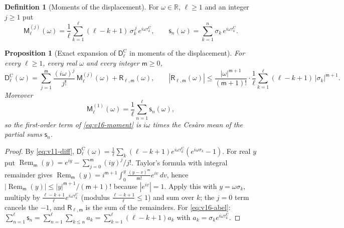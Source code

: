 \documentclass[11pt,a4paper]{article}
\numberwithin{equation}{section}
\newtheorem{proposition}[theorem]{Proposition}
\theoremstyle{definition}
\newtheorem{definition}[theorem]{Definition}
\theoremstyle{remark}
\begin{document}
\begin{definition}[Moments of the displacement]\label{def:v16-moments}
For $\omega\in\mathbb R$, $\ell\ge1$ and an integer $j\ge1$ put
\begin{equation}
\mathsf M_\ell^{(j)}(\omega)=\frac1\ell\sum_{k=1}^{\ell}(\ell-k+1)\,\sigma_k^{\,j}\,e^{i\omega\tau_k^{\mathrm C}},\qquad
\mathsf s_n(\omega)=\sum_{k=1}^{n}\sigma_k\,e^{i\omega\tau_k^{\mathrm C}} .
\end{equation}
\end{definition}

\begin{proposition}[Exact expansion of $\mathsf D_\ell^{\mathrm C}$ in moments of the displacement]\label{prop:v16-moment}
For every $\ell\ge1$, every real $\omega$ and every integer $\mathsf m\ge0$,
\begin{equation}\label{eq:v16-moment}
\mathsf D_\ell^{\mathrm C}(\omega)=\sum_{j=1}^{\mathsf m}\frac{(i\omega)^j}{j!}\,\mathsf M_\ell^{(j)}(\omega)+\mathsf R_{\ell,\mathsf m}(\omega),\qquad
|\mathsf R_{\ell,\mathsf m}(\omega)|\le\frac{|\omega|^{\mathsf m+1}}{(\mathsf m+1)!}\cdot\frac1\ell\sum_{k=1}^{\ell}(\ell-k+1)\,|\sigma_k|^{\mathsf m+1}.
\end{equation}
Moreover
\begin{equation}\label{eq:v16-abel}
\mathsf M_\ell^{(1)}(\omega)=\frac1\ell\sum_{n=1}^{\ell}\mathsf s_n(\omega),
\end{equation}
so the first-order term of \eqref{eq:v16-moment} is $i\omega$ times the Ces\`aro mean of the partial sums $\mathsf s_n$.
\end{proposition}
\begin{proof}
By \eqref{eq:v11-diff}, $\mathsf D_\ell^{\mathrm C}(\omega)=\frac1\ell\sum_k(\ell-k+1)e^{i\omega\tau_k^{\mathrm C}}(e^{i\omega\sigma_k}-1)$. For real $y$ put $\operatorname{Rem}_{\mathsf m}(y)=e^{iy}-\sum_{j=0}^{\mathsf m}(iy)^j/j!$. Taylor's formula with integral remainder gives $\operatorname{Rem}_{\mathsf m}(y)=i^{\mathsf m+1}\int_0^y\frac{(y-v)^{\mathsf m}}{\mathsf m!}e^{iv}\,dv$, hence $|\operatorname{Rem}_{\mathsf m}(y)|\le|y|^{\mathsf m+1}/(\mathsf m+1)!$ because $|e^{iv}|=1$. Apply this with $y=\omega\sigma_k$, multiply by $\frac{\ell-k+1}\ell e^{i\omega\tau_k^{\mathrm C}}$ (modulus $\frac{\ell-k+1}\ell\le1$) and sum over $k$; the $j=0$ term cancels the $-1$, and $\mathsf R_{\ell,\mathsf m}$ is the sum of the remainders. For \eqref{eq:v16-abel}: $\sum_{n=1}^\ell\mathsf s_n=\sum_{n=1}^\ell\sum_{k\le n}a_k=\sum_{k=1}^\ell(\ell-k+1)a_k$ with $a_k=\sigma_ke^{i\omega\tau_k^{\mathrm C}}$.
\end{proof}
\end{document}
